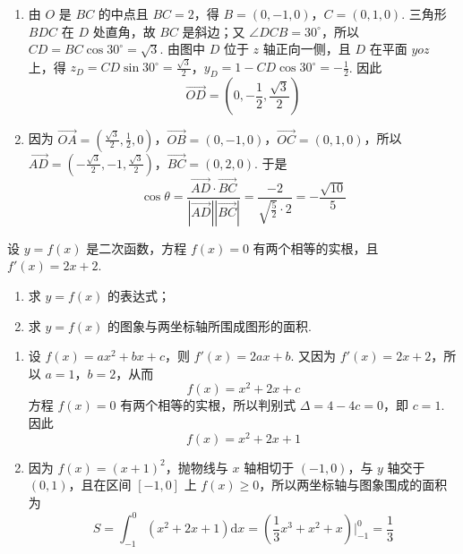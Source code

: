 \begin{solution}
\begin{enumerate}
\item 由 \(O\) 是 \(BC\) 的中点且 \(BC=2\)，得 \(B=(0,-1,0)\)，\(C=(0,1,0)\). 三角形 \(BDC\) 在 \(D\) 处直角，故 \(BC\) 是斜边；又 \(\angle DCB=30^\circ\)，所以 \(CD=BC\cos30^\circ=\sqrt{3}\). 由图中 \(D\) 位于 \(z\) 轴正向一侧，且 \(D\) 在平面 \(yoz\) 上，得
\(z_D=CD\sin30^\circ=\frac{\sqrt{3}}{2}\)，\(y_D=1-CD\cos30^\circ=-\frac{1}{2}\).
因此
\[
\overrightarrow{OD}=\left(0,-\frac{1}{2},\frac{\sqrt{3}}{2}\right)
\]

\item 因为 \(\overrightarrow{OA}=\left(\frac{\sqrt{3}}{2},\frac{1}{2},0\right)\)，\(\overrightarrow{OB}=(0,-1,0)\)，\(\overrightarrow{OC}=(0,1,0)\)，所以
\(\overrightarrow{AD}=\left(-\frac{\sqrt{3}}{2},-1,\frac{\sqrt{3}}{2}\right)\)，\(\overrightarrow{BC}=(0,2,0)\).
于是
\[
\cos\theta=\frac{\overrightarrow{AD}\cdot\overrightarrow{BC}}{|\overrightarrow{AD}||\overrightarrow{BC}|}
=\frac{-2}{\sqrt{\frac{5}{2}}\cdot2}=-\frac{\sqrt{10}}{5}
\]
\end{enumerate}
\end{solution}

\begin{problem}[B]
设 \(y=f(x)\) 是二次函数，方程 \(f(x)=0\) 有两个相等的实根，且 \(f'(x)=2x+2\).

\begin{enumerate}
\item 求 \(y=f(x)\) 的表达式；
\item 求 \(y=f(x)\) 的图象与两坐标轴所围成图形的面积.
\end{enumerate}
\end{problem}

\begin{solution}
\begin{enumerate}
\item 设 \(f(x)=ax^2+bx+c\)，则 \(f'(x)=2ax+b\). 又因为 \(f'(x)=2x+2\)，所以 \(a=1\)，\(b=2\)，从而
\[
f(x)=x^2+2x+c
\]
方程 \(f(x)=0\) 有两个相等的实根，所以判别式 \(\Delta=4-4c=0\)，即 \(c=1\). 因此
\[
f(x)=x^2+2x+1
\]

\item 因为 \(f(x)=(x+1)^2\)，抛物线与 \(x\) 轴相切于 \((-1,0)\)，与 \(y\) 轴交于 \((0,1)\)，且在区间 \([-1,0]\) 上 \(f(x)\geqslant0\)，所以两坐标轴与图象围成的面积为
\[
S=\int_{-1}^{0}(x^2+2x+1)\mathrm{d}x
=\left(\frac{1}{3}x^3+x^2+x\right)\Big|_{-1}^{0}
=\frac{1}{3}
\]
\end{enumerate}
\end{solution}

